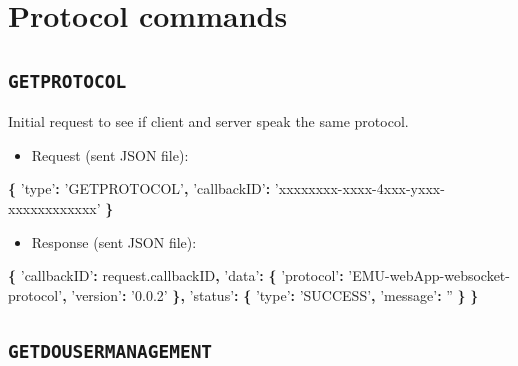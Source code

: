 \documentclass[]{book}
\newenvironment{Shaded}{\begin{snugshade}}{\end{snugshade}}
\newcommand{\AttributeTok}[1]{\textcolor[rgb]{0.77,0.63,0.00}{#1}}
\newcommand{\NormalTok}[1]{#1}
\newcommand{\OperatorTok}[1]{\textcolor[rgb]{0.81,0.36,0.00}{\textbf{#1}}}
\newcommand{\StringTok}[1]{\textcolor[rgb]{0.31,0.60,0.02}{#1}}
\newcommand{\VariableTok}[1]{\textcolor[rgb]{0.00,0.00,0.00}{#1}}
\providecommand{\tightlist}{%
  \setlength{\itemsep}{0pt}\setlength{\parskip}{0pt}}
\theoremstyle{definition}
\theoremstyle{definition}
\theoremstyle{definition}
\theoremstyle{remark}
\begin{document}
\hypertarget{protocol-commands}{%
\section{Protocol commands}\label{protocol-commands}}

\hypertarget{getprotocol}{%
\subsection{\texorpdfstring{\texttt{GETPROTOCOL}}{GETPROTOCOL}}\label{getprotocol}}

Initial request to see if client and server speak the same protocol.

\begin{itemize}
\tightlist
\item
  Request (sent JSON file):
\end{itemize}

\begin{Shaded}
\begin{Highlighting}[]
\OperatorTok{\{}
  \StringTok{'type'}\OperatorTok{:} \StringTok{'GETPROTOCOL'}\OperatorTok{,}
  \StringTok{'callbackID'}\OperatorTok{:} \StringTok{'xxxxxxxx-xxxx-4xxx-yxxx-xxxxxxxxxxxx'}
\OperatorTok{\}}
\end{Highlighting}
\end{Shaded}

\begin{itemize}
\tightlist
\item
  Response (sent JSON file):
\end{itemize}

\begin{Shaded}
\begin{Highlighting}[]
\OperatorTok{\{}
  \StringTok{'callbackID'}\OperatorTok{:} \VariableTok{request}\NormalTok{.}\AttributeTok{callbackID}\OperatorTok{,}
  \StringTok{'data'}\OperatorTok{:} \OperatorTok{\{}
    \StringTok{'protocol'}\OperatorTok{:} \StringTok{'EMU-webApp-websocket-protocol'}\OperatorTok{,}
    \StringTok{'version'}\OperatorTok{:} \StringTok{'0.0.2'}
  \OperatorTok{\},}
  \StringTok{'status'}\OperatorTok{:} \OperatorTok{\{}
    \StringTok{'type'}\OperatorTok{:} \StringTok{'SUCCESS'}\OperatorTok{,}
    \StringTok{'message'}\OperatorTok{:} \StringTok{''}
  \OperatorTok{\}}
\OperatorTok{\}}
\end{Highlighting}
\end{Shaded}

\hypertarget{getdousermanagement}{%
\subsection{\texorpdfstring{\texttt{GETDOUSERMANAGEMENT}}{GETDOUSERMANAGEMENT}}\label{getdousermanagement}}
\end{document}
